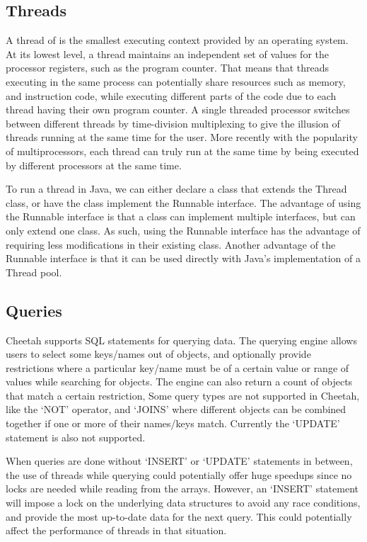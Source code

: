 \documentclass[11pt,journal,compsoc]{IEEEtran}
\begin{document}
\subsection{Threads}

A thread of is the smallest executing context provided by an operating system. At its lowest level, a thread maintains an independent set of values for the processor registers, such as the program counter. That means that threads executing in the same process can potentially share resources such as memory, and instruction code, while executing different parts of the code due to each thread having their own program counter. A single threaded processor switches between different threads by time-division multiplexing to give the illusion of threads running at the same time for the user. More recently with the popularity of multiprocessors, each thread can truly run at the same time by being executed by different processors at the same time.


To run a thread in Java, we can either declare a class that extends the Thread class, or have the class implement the Runnable interface. The advantage of using the Runnable interface is that a class can implement multiple interfaces, but can only extend one class. As such, using the Runnable interface has the advantage of requiring less modifications in their existing class. Another advantage of the Runnable interface is that it can be used directly with Java’s implementation of a Thread pool. 

\subsection{Queries}

Cheetah supports SQL statements for querying data. The querying engine allows users to select some keys/names out of objects, and optionally provide  restrictions where a particular key/name must be of a certain value or range of values while searching for objects. The engine can also return a count of objects that match a certain restriction, Some query types are not supported in Cheetah, like the ‘NOT’ operator, and ‘JOINS’ where different objects can be combined together if one or more of their names/keys match. Currently the ‘UPDATE’ statement is also not supported.


When queries are done without ‘INSERT’ or ‘UPDATE’ statements in between, the use of threads while querying could potentially offer huge speedups since no locks are needed while reading from the arrays. However, an ‘INSERT’ statement will impose a lock on the underlying data structures to avoid any race conditions, and provide the most up-to-date data for the next query. This could potentially affect the performance of threads in that situation.
\end{document}
